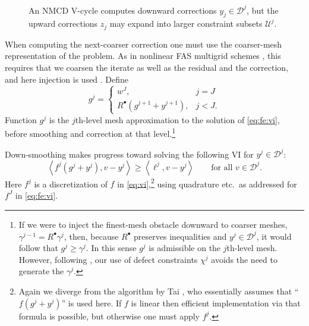 \documentclass[letterpaper,final,12pt,reqno]{amsart}
\theoremstyle{cstyle}
\theoremstyle{cstyle*}
\theoremstyle{dstyle}
\numberwithin{equation}{section}
\numberwithin{figure}{section}
\numberwithin{table}{section}
\numberwithin{theorem}{section}
\newcommand{\ip}[2]{\left<#1,#2\right>}
\newcommand{\iR}{R^{\bullet}}
\begin{document}
\begin{figure}[ht]
\begin{center}

\end{center}
\caption{An NMCD V-cycle computes downward corrections $y_j \in \mathcal{D}^j$, but the upward corrections $z_j$ may expand into larger constraint subsets $\mathcal{U}^j$.}
\label{fig:nmcdvcycle}
\end{figure}

When computing the next-coarser correction one must use the coarser-mesh representation of the problem.  As in nonlinear FAS multigrid schemes \cite{BrandtLivne2011,Bruneetal2015,Trottenbergetal2001}, this requires that we coarsen the iterate as well as the residual and the correction, and here injection is used \cite[section 5.3]{Trottenbergetal2001}.  Define
\begin{equation}
g^j = \begin{cases} w^J, & j=J \\
                    \iR(g^{j+1} + y^{j+1}), & j < J.
      \end{cases}  \label{eq:fe:defineg}
\end{equation}
Function $g^j$ is the $j$th-level mesh approximation to the solution of \eqref{eq:fe:vi}, before smoothing and correction at that level.\footnote{If we were to inject the finest-mesh obstacle downward to coarser meshes, $\gamma^{j-1} = \iR \gamma^j$, then, because $\iR$ preserves inequalities and $y^j \in \mathcal{D}^j$, it would follow that $g^j \ge \gamma^j$.  In this sense $g^j$ is admissible on the $j$th-level mesh.  However, following \cite{GraeserKornhuber2009}, our use of defect constraints $\chi^j$ avoids the need to generate the $\gamma^j$.}

Down-smoothing makes progress toward solving the following VI for $y^j \in \mathcal{D}^j$:
\begin{equation}
\ip{f^j(g^j + y^j)}{v-y^j} \ge \ip{\ell^j}{v-y^j} \qquad \text{for all } v\in \mathcal{D}^j. \label{eq:fe:downvi}
\end{equation}
Here $f^j$ is a discretization of $f$ in \eqref{eq:vi},\footnote{Again we diverge from the algorithm by Tai \cite{Tai2003}, who essentially assumes that ``$f(g^j + y^j)$'' is used here.  If $f$ is linear then efficient implementation via that formula is possible, but otherwise one must apply $f^j$.} using quadrature etc.~as addressed for $f^J$ in \eqref{eq:fe:vi}.
\end{document}
